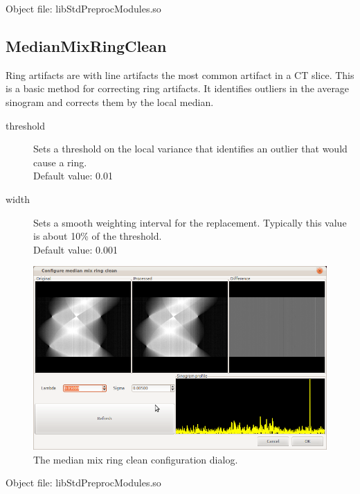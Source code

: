 \documentclass[a4paper]{scrreprt}
\begin{document}
Object file: libStdPreprocModules.so

\subsection{MedianMixRingClean}
Ring artifacts are with line artifacts the most common artifact in a CT slice.
This is a basic method for correcting ring artifacts. It identifies outliers in
the average sinogram and corrects them by the local median.
\begin{description}
 \item[threshold] Sets a threshold on the local variance that identifies an
outlier that would cause a ring. \\ Default value: 0.01
\item[width] Sets a smooth weighting interval for the replacement. Typically
this value is about 10\% of the threshold. \\ Default value: 0.001
\end{description}
\begin{figure}[ht!]
\centering
\includegraphics[scale=0.5]{figures/ConfMedMixRing.png}
\caption{The median mix ring clean configuration dialog.}
\end{figure}

Object file: libStdPreprocModules.so
\end{document}
